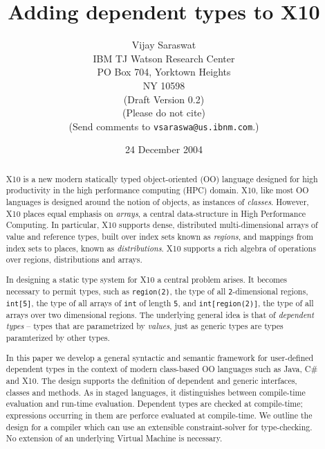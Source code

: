 \documentclass[fullpage]{article}
\def\csharp{{\sf C\#}}
\def\Xten{{\sf X10}}
\def\java{{\sf Java}}
\begin{document}
\title{Adding dependent types to X10}
\author{
Vijay Saraswat \\
IBM TJ Watson Research Center \\
PO Box 704, Yorktown Heights\\
NY 10598\\
({\sc Draft Version 0.2})\\
(Please do not cite)\\
(Send comments to {\tt vsaraswa@us.ibnm.com}.)
}

\date{24 December 2004}
\maketitle

\begin{abstract}
\Xten{} is a new modern statically typed object-oriented (OO) language
designed for high productivity in the high performance computing (HPC)
domain. \Xten{}, like most OO languages is designed around the notion
of objects, as instances of {\em classes}. However, \Xten{} places
equal emphasis on {\em arrays}, a central data-structure in High
Performance Computing. In particular, \Xten{} supports dense,
distributed multi-dimensional arrays of value and reference types,
built over index sets known as {\em regions}, and mappings from index
sets to places, known as {\em distributions}.  \Xten{} supports a rich
algebra of operations over regions, distributions and arrays.

In designing a static type system for \Xten{} a central problem
arises. It becomes necessary to permit types, such as {\tt region(2)},
the type of all {\tt 2}-dimensional regions, {\tt int[5]}, the type of
all arrays of {\tt int} of length {\tt 5}, and {\tt int[region(2)]},
the type of all arrays over two dimensional regions. The underlying
general idea is that of {\em dependent types} -- types that are
parametrized by {\em values}, just as generic types are types
paramterized by other types.

In this paper we develop a general syntactic and semantic framework
for user-defined dependent types in the context of modern class-based
OO languages such as \java{}, \csharp{} and \Xten{}. The design
supports the definition of dependent and generic interfaces, classes
and methods.  As in staged languages, it distinguishes between
compile-time evaluation and run-time evaluation. Dependent types are
checked at compile-time; expressions occurring in them are perforce
evaluated at compile-time.  We outline the design for a compiler which
can use an extensible constraint-solver for type-checking. No
extension of an underlying Virtual Machine is necessary.

\end{abstract}
\end{document}
